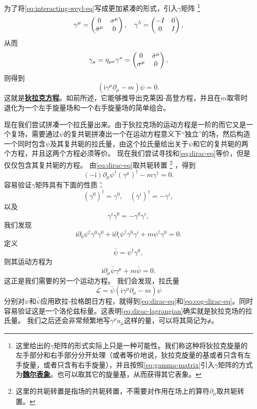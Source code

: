 \documentclass[hyperref, UTF8, a4paper]{ctexart}
\newcommand*{\ii}{\mathrm{i}}
\newcommand{\concept}[1]{\underline{\textbf{#1}}}
\begin{document}
为了将\eqref{eq:interacting-weyl-eq}写成更加紧凑的形式，引入$\gamma$矩阵%
\footnote{这里给出的$\gamma$矩阵的形式实际上只是一种可能性。我们称这种将狄拉克旋量的左手部分和右手部分分开处理（或者等价地说，狄拉克旋量的基或者只含有左手旋量，或者只含有右手旋量），并且按照\eqref{eq:gamma-matrix}引入$\gamma$矩阵的方式为\concept{魏尔表象}。也可以取其它的旋量基，从而获得其它表象。}
\begin{equation}
    \gamma^\mu = \pmqty{0 & \sigma^\mu \\ \bar{\sigma}^\mu & 0}, \quad \gamma^5 = \pmqty{-I & 0 \\ 0 & I},
    \label{eq:gamma-matrix}
\end{equation}
从而
\begin{equation}
    \gamma_\mu = \eta_{\mu \nu} \gamma^\nu = \pmqty{ 0 & \bar{\sigma}^\mu \\ \sigma^\mu & 0 },
\end{equation}
则得到
\begin{equation}
    (\ii \gamma^\mu \partial_\mu - m) \psi = 0.
    \label{eq:dirac-eq}
\end{equation}
这就是\concept{狄拉克方程}。如前所述，它能够推导出克莱因-高登方程，并且在$m$取零时退化为一个左手旋量场和一个右手旋量场的简单组合。

现在我们尝试拼凑一个拉氏量出来。由于狄拉克场的运动方程是一阶的而它又是一个复场，需要通过$\psi$的复共轭拼凑出一个在运动方程意义下“独立”的场，然后构造一个同时包含$\psi$及其复共轭的拉氏量，由这个拉氏量给出关于$\psi$和它的复共轭的两个方程，并且这两个方程必须等价。
现在我们尝试寻找和\eqref{eq:dirac-eq}等价，但是仅仅包含其复共轭的方程。
由\eqref{eq:dirac-eq}取共轭转置%
\footnote{这里的共轭转置是指场的共轭转置，不需要对作用在场上的算符$\partial_\mu$取共轭转置。}
，得到
\[
    (-\ii) \partial_\mu \psi^\dagger (\gamma^\mu)^\dagger - m \gamma^\dagger = 0.
\]
容易验证$\gamma$矩阵具有下面的性质：
\[
    (\gamma^0)^\dagger = \gamma^0, \quad (\gamma^i)^\dagger = - \gamma^i, 
\]
以及
\[
    \gamma^i \gamma^0 = - \gamma^0 \gamma^i,
\]
我们发现
\[
    \ii \partial_0 \psi^\dagger \gamma^0 \gamma^0 + \ii \partial_i \psi^\dagger \gamma^0 \gamma^i + m \psi^\dagger \gamma^0 = 0.
\]
定义
\begin{equation}
    \bar{\psi} = \psi^\dagger \gamma^0,
\end{equation}
则其运动方程为
\begin{equation}
    \ii \partial_\mu \bar{\psi} \gamma^\mu + m \bar{\psi} = 0.
    \label{eq:cog-dirac-eq}
\end{equation}
这正是我们需要的另一个运动方程。
我们会发现，拉氏量
\begin{equation}
    \mathcal{L} = \bar{\psi} (\ii \gamma^\mu \partial_\mu - m) \psi
    \label{eq:dirac-lagrangian}
\end{equation}
分别对$\psi$和$\bar{\psi}$应用欧拉-拉格朗日方程，就得到\eqref{eq:dirac-eq}和\eqref{eq:cog-dirac-eq}。同时容易验证这是一个洛伦兹标量。这表明\eqref{eq:dirac-lagrangian}确实就是狄拉克场的拉氏量。
我们之后还会非常频繁地写$\gamma^\mu a_\mu$这样的量，可以将其简记为$\slashed{a}$。
\end{document}
